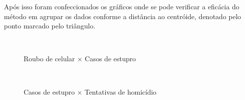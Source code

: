 \documentclass[a4paper, 12pt]{article}
\begin{document}
\begin{multicols}{2}
		Após isso foram confeccionados os gráficos onde se pode verificar a eficácia do método em agrupar os dados conforme a distância ao centróide, denotado pelo ponto marcado pelo triângulo.\\
	\end{multicols}		
	
	\begin{figure}[H]
		\centering
			~
			\caption{Roubo de celular $\times$ Casos de estupro}
			\label{fig:celEst}
	\end{figure}
	
	\begin{figure}[H]
		\centering
		~
		\caption{Casos de estupro $\times$ Tentativas de homicídio}
		\label{fig:estHom}
	\end{figure}
\end{document}
